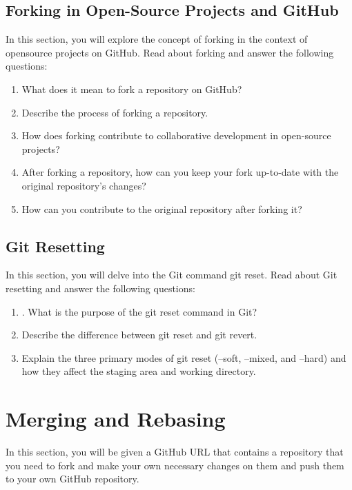 \documentclass{article}
\begin{document}
\subsection{Forking in Open-Source
Projects and GitHub}

In this section, you will explore the concept of forking in the context of opensource projects on GitHub. Read about forking and answer the following questions:
\begin{enumerate}
    \item What does it mean to fork a repository on GitHub?
    \item Describe the process of forking a repository.
    \item How does forking contribute to collaborative development in open-source
projects?

    \item After forking a repository, how can you keep your fork up-to-date with
the original repository’s changes?

    \item How can you contribute to the original repository after forking it?
\end{enumerate}

\subsection{Git Resetting}

In this section, you will delve into the Git command git reset. Read about
Git resetting and answer the following questions:

\begin{enumerate}
    \item . What is the purpose of the git reset command in Git?
    \item Describe the difference between git reset and git revert.
    \item Explain the three primary modes of git reset (--soft, --mixed, and
--hard) and how they affect the staging area and working directory.

\end{enumerate}

\newpage

\section{Merging and Rebasing
}
In this section, you will be given a GitHub URL that contains a repository that
you need to fork and make your own necessary changes on them and push them
to your own GitHub repository.
\end{document}
